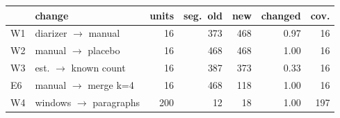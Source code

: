 \begin{tabular}{@{}llrrrrr@{}}
\toprule
& change & units & seg.\ old & new & changed & cov. \\
\midrule
W1 & diarizer $\to$ manual & 16 & 373 & 468 & 0.97 & 16 \\
W2 & manual $\to$ placebo & 16 & 468 & 468 & 1.00 & 16 \\
W3 & est. $\to$ known count & 16 & 387 & 373 & 0.33 & 16 \\
E6 & manual $\to$ merge k=4 & 16 & 468 & 118 & 1.00 & 16 \\
W4 & windows $\to$ paragraphs & 200 & 12 & 18 & 1.00 & 197 \\
\bottomrule
\end{tabular}
